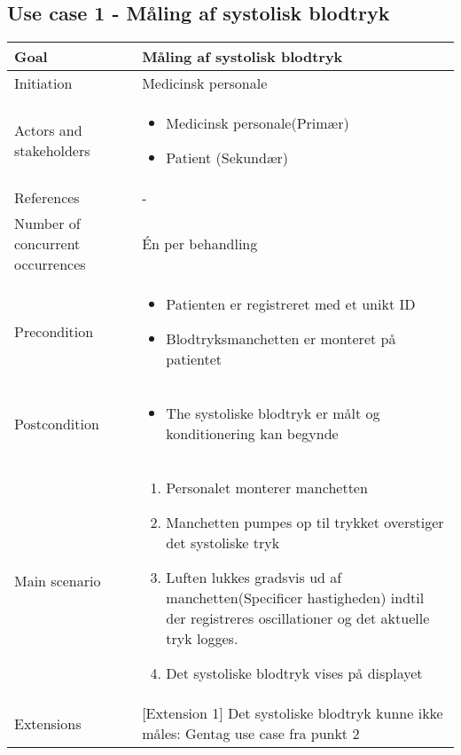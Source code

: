 \subsection{Use case 1 - Måling af systolisk blodtryk}
\begin{center}
		\begin{tabular}{ | m{4cm} | m{8cm}| } 
			\hline
			Goal& Måling af systolisk blodtryk \\ 
			\hline
			Initiation &  Medicinsk personale\\
			\hline
			Actors and stakeholders & 
			\begin{itemize}
				\item Medicinsk personale(Primær)
				\item Patient (Sekundær)
			\end{itemize} \\ 
			\hline
			References & - \\ 
			\hline
			Number of concurrent occurrences & Én per behandling\\ 
			\hline	
			Precondition & 
			\begin{itemize}
				\item Patienten er registreret med et unikt ID
				\item Blodtryksmanchetten er monteret på patientet
			\end{itemize} \\ 
			\hline
			Postcondition & 
			\begin{itemize}
				\item The systoliske blodtryk er målt og konditionering kan begynde
			\end{itemize} \\ 
			\hline
			Main scenario & \begin{enumerate}
				\item Personalet monterer manchetten
				\item Manchetten pumpes op til trykket overstiger det systoliske tryk
				\item Luften lukkes gradsvis ud af manchetten(Specificer hastigheden) indtil der registreres oscillationer og det aktuelle tryk logges. 
				\item Det systoliske blodtryk vises på displayet
			\end{enumerate} \\ 
			\hline
			Extensions & [Extension 1] Det systoliske blodtryk kunne ikke måles: Gentag use case fra punkt 2 \\ 
			\hline
		\end{tabular}
	\end{center}